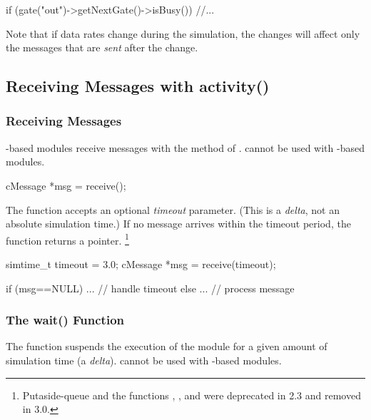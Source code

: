 \begin{cpp}
if (gate("out")->getNextGate()->isBusy())
  //...
\end{cpp}

Note that if data rates change during the
simulation, the changes will affect only the messages that are
\textit{sent} after the change.


\subsection{Receiving Messages with activity()}

\subsubsection{Receiving Messages}
\label{sec:simple-modules:receiving-messages}

-based modules receive messages with the 
method of .  cannot be used with
-based modules.

\begin{cpp}
cMessage *msg = receive();
\end{cpp}

The  function accepts an optional \textit{timeout}
parameter. (This is a \textit{delta}, not an
absolute simulation time.) If no message arrives within the timeout
period, the function returns a  pointer.
    \footnote{Putaside-queue and the functions ,
    , and  were deprecated
    in {\opp} 2.3 and removed in {\opp} 3.0.}

\begin{cpp}
simtime_t timeout = 3.0;
cMessage *msg = receive(timeout);

if (msg==NULL)
{
    ...   // handle timeout
}
else
{
    ...  // process message
}
\end{cpp}

\subsubsection{The wait() Function}
\label{sec:simple-modules:wait}

The  function suspends the execution of the module for a
given amount of simulation time (a \textit{delta}).  cannot
be used with -based modules.

